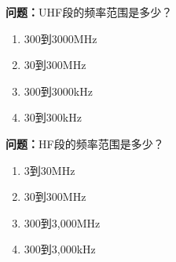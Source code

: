 \documentclass[UTF8]{ctexbook}
\begin{document}
\textbf{问题：}UHF段的频率范围是多少？
\begin{enumerate}[label=\Alph*), leftmargin=3em]
  \item 300到3000MHz
  \item 30到300MHz
  \item 300到3000kHz
  \item 30到300kHz
\end{enumerate}

\textbf{问题：}HF段的频率范围是多少？
\begin{enumerate}[label=\Alph*), leftmargin=3em]
  \item 3到30MHz
  \item 30到300MHz
  \item 300到3,000MHz
  \item 300到3,000kHz
\end{enumerate}



\end{document}
